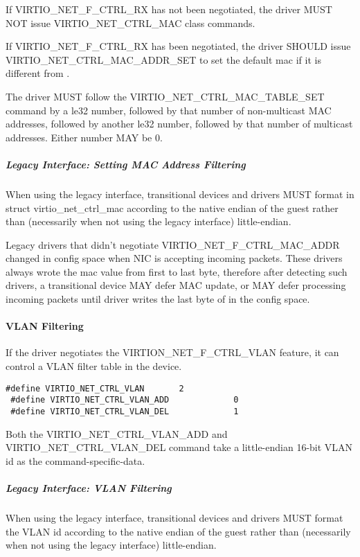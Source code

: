 If VIRTIO_NET_F_CTRL_RX has not been negotiated,
the driver MUST NOT issue VIRTIO_NET_CTRL_MAC class commands.

If VIRTIO_NET_F_CTRL_RX has been negotiated,
the driver SHOULD issue VIRTIO_NET_CTRL_MAC_ADDR_SET
to set the default mac if it is different from .

The driver MUST follow the VIRTIO_NET_CTRL_MAC_TABLE_SET command
by a le32 number, followed by that number of non-multicast
MAC addresses, followed by another le32 number, followed by
that number of multicast addresses.  Either number MAY be 0.

\subparagraph{Legacy Interface: Setting MAC Address Filtering}\label{sec:Device Types / Network Device / Device Operation / Control Virtqueue / Setting MAC Address Filtering / Legacy Interface: Setting MAC Address Filtering}
When using the legacy interface, transitional devices and drivers
MUST format  in struct virtio_net_ctrl_mac
according to the native endian of the guest rather than
(necessarily when not using the legacy interface) little-endian.

Legacy drivers that didn't negotiate VIRTIO_NET_F_CTRL_MAC_ADDR
changed  in config space when NIC is accepting
incoming packets. These drivers always wrote the mac value from
first to last byte, therefore after detecting such drivers,
a transitional device MAY defer MAC update, or MAY defer
processing incoming packets until driver writes the last byte
of  in the config space.

\paragraph{VLAN Filtering}\label{sec:Device Types / Network Device / Device Operation / Control Virtqueue / VLAN Filtering}

If the driver negotiates the VIRTION_NET_F_CTRL_VLAN feature, it
can control a VLAN filter table in the device.

\begin{lstlisting}
#define VIRTIO_NET_CTRL_VLAN       2
 #define VIRTIO_NET_CTRL_VLAN_ADD             0
 #define VIRTIO_NET_CTRL_VLAN_DEL             1
\end{lstlisting}

Both the VIRTIO_NET_CTRL_VLAN_ADD and VIRTIO_NET_CTRL_VLAN_DEL
command take a little-endian 16-bit VLAN id as the command-specific-data.

\subparagraph{Legacy Interface: VLAN Filtering}\label{sec:Device Types / Network Device / Device Operation / Control Virtqueue / VLAN Filtering / Legacy Interface: VLAN Filtering}
When using the legacy interface, transitional devices and drivers
MUST format the VLAN id
according to the native endian of the guest rather than
(necessarily when not using the legacy interface) little-endian.

